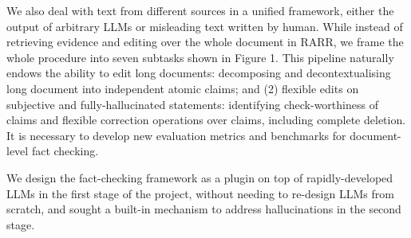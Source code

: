 We also deal with text from different sources in a unified framework, either the output of arbitrary LLMs or misleading text written by human. While instead of retrieving evidence and editing over the whole document in RARR, we frame the whole procedure into seven subtasks shown in Figure 1. This pipeline naturally endows the ability to edit long documents: decomposing and decontextualising long document into independent atomic claims; and (2) flexible edits on subjective and fully-hallucinated statements: identifying check-worthiness of claims and flexible correction operations over claims, including complete deletion. 
It is necessary to develop new evaluation metrics and benchmarks for document-level fact checking.

We design the fact-checking framework as a plugin on top of rapidly-developed LLMs in the first stage of the project, without needing to re-design LLMs from scratch, and sought a built-in mechanism to address hallucinations in the second stage.



